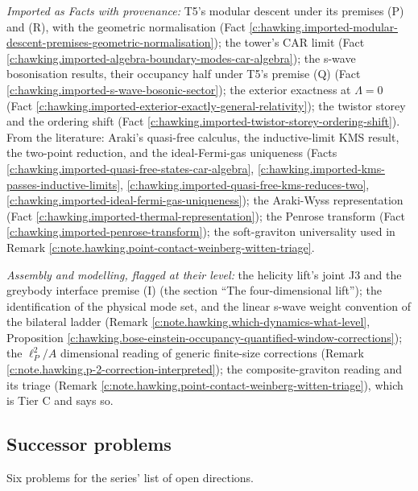 \documentclass[11pt]{article}
\theoremstyle{definition}
\theoremstyle{plain}
\begin{document}
\emph{Imported as Facts with provenance:} T5's modular descent under its premises (P) and (R), with the geometric normalisation (Fact \ref{c:hawking.imported-modular-descent-premises-geometric-normalisation}); the tower's CAR limit (Fact \ref{c:hawking.imported-algebra-boundary-modes-car-algebra}); the s-wave bosonisation results, their occupancy half under T5's premise (Q) (Fact \ref{c:hawking.imported-s-wave-bosonic-sector}); the exterior exactness at $\Lambda = 0$ (Fact \ref{c:hawking.imported-exterior-exactly-general-relativity}); the twistor storey and the ordering shift (Fact \ref{c:hawking.imported-twistor-storey-ordering-shift}). From the literature: Araki's quasi-free calculus, the inductive-limit KMS result, the two-point reduction, and the ideal-Fermi-gas uniqueness (Facts \ref{c:hawking.imported-quasi-free-states-car-algebra}, \ref{c:hawking.imported-kms-passes-inductive-limits}, \ref{c:hawking.imported-quasi-free-kms-reduces-two}, \ref{c:hawking.imported-ideal-fermi-gas-uniqueness}); the Araki-Wyss representation (Fact \ref{c:hawking.imported-thermal-representation}); the Penrose transform (Fact \ref{c:hawking.imported-penrose-transform}); the soft-graviton universality \cite{Weinberg1964} used in Remark \ref{c:note.hawking.point-contact-weinberg-witten-triage}.

\emph{Assembly and modelling, flagged at their level:} the helicity lift's joint J3 and the greybody interface premise (I) (the section ``The four-dimensional lift''); the identification of the physical mode set, and the linear s-wave weight convention of the bilateral ladder (Remark \ref{c:note.hawking.which-dynamics-what-level}, Proposition \ref{c:hawking.bose-einstein-occupancy-quantified-window-corrections}); the $\ell_P^2/A$ dimensional reading of generic finite-size corrections (Remark \ref{c:note.hawking.p-2-correction-interpreted}); the composite-graviton reading and its triage (Remark \ref{c:note.hawking.point-contact-weinberg-witten-triage}), which is Tier C and says so.

\subsection*{Successor problems}
\label{c:note.hawking.setting-successor-problems}
Six problems for the series' list of open directions.
\end{document}
